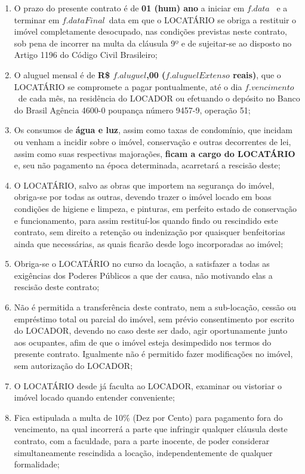 \documentclass[a4paper,12pt]{article}
\begin{document}
\begin{enumerate}

\item O prazo do presente contrato é de \textbf{01 (hum) ano} a iniciar em ${f.data}$
\ e a terminar em ${f.dataFinal}$\ data em que o LOCATÁRIO 
se obriga a restituir o imóvel completamente desocupado, nas condições previstas neste contrato,
sob pena de incorrer na multa da cláusula 9º e de sujeitar-se ao disposto no Artigo 1196 do Código Civil Brasileiro;
\item O aluguel mensal é de \textbf{R\$ ${f.aluguel}$,00 (${f.aluguelExtenso}$ reais)},
que o LOCATÁRIO se compromete a pagar pontualmente, até o dia ${f.vencimento}$\
de cada mês, na residência do LOCADOR ou efetuando o depósito no Banco do Brasil Agência 4600-0 poupança número 9457-9, operação 51; 
\item Os consumos de \textbf{água e luz}, assim como taxas de condomínio, que incidam ou venham a incidir sobre o imóvel, conservação e outras decorrentes de lei, assim como suas respectivas majorações, \textbf{ficam a cargo do LOCATÁRIO} e, seu não pagamento na época determinada, acarretará a rescisão deste; 
\item O LOCATÁRIO, salvo as obras que importem na segurança do imóvel, obriga-se por todas as outras, devendo trazer o imóvel locado em boas condições de higiene e limpeza, e pinturas, em perfeito estado de conservação e funcionamento, para assim restituí-los quando findo ou rescindido este contrato, sem direito a retenção ou indenização por quaisquer benfeitorias ainda que necessárias, as quais ficarão desde logo incorporadas ao imóvel; 
\item Obriga-se o LOCATÁRIO no curso da locação, a satisfazer a todas as exigências dos Poderes Públicos a que der causa, não motivando elas a rescisão deste contrato;  
\item Não é permitida a transferência deste contrato, nem a sub-locação, cessão ou empréstimo total ou parcial do imóvel, sem prévio consentimento por escrito do LOCADOR, devendo no caso deste ser dado, agir oportunamente junto aos ocupantes, afim de que o imóvel esteja desimpedido nos termos do presente contrato. Igualmente não é permitido fazer modificações no imóvel, sem autorização do LOCADOR;
\item O LOCATÁRIO desde já faculta ao LOCADOR, examinar ou vistoriar o imóvel locado quando entender conveniente;
\item Fica estipulada a multa de 10\% (Dez por Cento) para pagamento fora do vencimento, na qual incorrerá a parte que infringir qualquer cláusula deste contrato, com a faculdade, para a parte inocente, de poder considerar simultaneamente rescindida a locação, independentemente de qualquer formalidade;

\end{enumerate}
\end{document}
